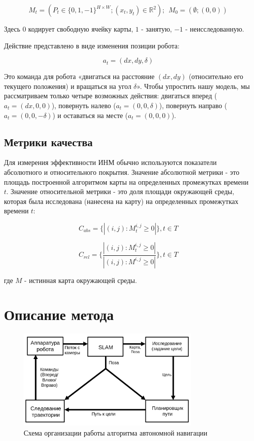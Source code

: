 \documentclass{mipt-thesis-ms}
\begin{document}
	$$ M_t = (P_t \in \{0, 1, -1 \} ^ {H \times W}; (x_t, y_t) \in \mathbb {R} ^ 2); \ \ M_0 = (\emptyset; (0, 0)) $$
	
	Здесь $0$ кодирует свободную ячейку карты, $1$ - занятую, $-1$ - неисследованную.
	
	Действие представлено в виде изменения позиции робота:
	
	$$ a_t = (dx, dy, \delta) $$
	
	Это команда для робота «двигаться на расстояние $ (dx, dy) $ (относительно его текущего положения) и вращаться на угол $ \delta $». Чтобы упростить нашу модель, мы рассматриваем только четыре возможных действия: двигаться вперед ($ a_t = (dx, 0, 0) $), повернуть налево ($ a_t = (0, 0, \delta) $), повернуть направо ($ a_t = (0, 0, - \delta) $) и оставаться на месте ($ a_t = (0, 0, 0) $).
	
	\subsection{Метрики качества}
	
	Для измерения эффективности ИНМ обычно используются показатели абсолютного и относительного покрытия. Значение абсолютной метрики - это площадь построенной алгоритмом карты на определенных промежутках времени $ t $. Значение относительной метрики - это доля площади окружающей среды, которая была исследована (нанесена на карту) на определенных промежутках времени $ t $:
	
	\begin{equation}
	C_{abs} = \{|(i,j): M_t^{i,j} \geq 0|\}, t \in T
	\label{eq_cov_abs}
	\end{equation}
	
	\begin{equation}
	C_{rel} = \lbrace \frac{|(i,j): M_t^{i,j} \geq 0|}{|(i,j): M^{i,j} \geq 0|} \rbrace, t \in T
	\label{eq_cov_rel}
	\end{equation}
	
	где $M$ - истинная карта окружающей среды.
	
	\section{Описание метода}
	
	\begin{figure}
		\centering
		\includegraphics[width=0.8\textwidth]{img/pipeline_scheme_rus.png}
		\caption{Схема организации работы алгоритма автономной навигации}
		\label{figure_pipeline}
	\end{figure}
	
\end{document}
